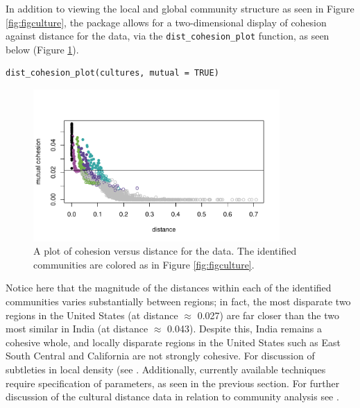 In addition to viewing the local and global community structure as seen in Figure \ref{fig:figculture}, the  package allows for a two-dimensional display of cohesion against distance for the data, via the \texttt{dist\_cohesion\_plot} function, as seen below (Figure \ref{fig:figco}).

\begin{verbatim}
dist_cohesion_plot(cultures, mutual = TRUE)
\end{verbatim}

\begin{figure}[H]
\centering
\includegraphics[width=3.7in,trim=0in .4in 0in .7in,clip]{dagostino-mcgowan_files/figure-latex/figco-1.pdf}
\caption{\label{fig:figco}A plot of cohesion versus distance for the data. The identified communities are colored as in Figure \ref{fig:figculture}.}
\end{figure}

Notice here that the magnitude of the distances within each of the identified communities varies substantially between regions; in fact, the most disparate two regions in the United States (at distance \(\approx\) 0.027) are far closer than the two most similar in India (at distance \(\approx\) 0.043). Despite this, India remains a cohesive whole, and locally disparate regions in the United States such as East South Central and California are not strongly cohesive. For discussion of subtleties in local density (see \citet{berenhaut2022social}. Additionally, currently available techniques require specification of parameters, as seen in the previous section. For further discussion of the cultural distance data in relation to community analysis see \citet{berenhaut2022social}.

